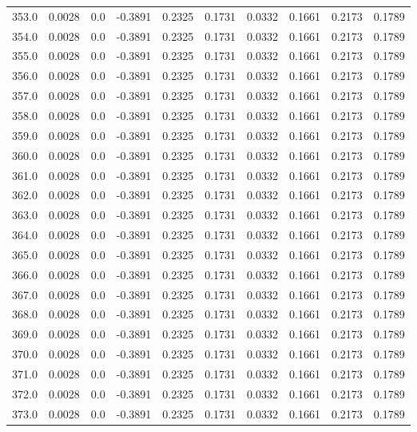 \begin{longtable}{lrrrrrrrrr}
353.0 & 0.0028 & 0.0 & -0.3891 & 0.2325 & 0.1731 & 0.0332 & 0.1661 & 0.2173 & 0.1789 \\
354.0 & 0.0028 & 0.0 & -0.3891 & 0.2325 & 0.1731 & 0.0332 & 0.1661 & 0.2173 & 0.1789 \\
355.0 & 0.0028 & 0.0 & -0.3891 & 0.2325 & 0.1731 & 0.0332 & 0.1661 & 0.2173 & 0.1789 \\
356.0 & 0.0028 & 0.0 & -0.3891 & 0.2325 & 0.1731 & 0.0332 & 0.1661 & 0.2173 & 0.1789 \\
357.0 & 0.0028 & 0.0 & -0.3891 & 0.2325 & 0.1731 & 0.0332 & 0.1661 & 0.2173 & 0.1789 \\
358.0 & 0.0028 & 0.0 & -0.3891 & 0.2325 & 0.1731 & 0.0332 & 0.1661 & 0.2173 & 0.1789 \\
359.0 & 0.0028 & 0.0 & -0.3891 & 0.2325 & 0.1731 & 0.0332 & 0.1661 & 0.2173 & 0.1789 \\
360.0 & 0.0028 & 0.0 & -0.3891 & 0.2325 & 0.1731 & 0.0332 & 0.1661 & 0.2173 & 0.1789 \\
361.0 & 0.0028 & 0.0 & -0.3891 & 0.2325 & 0.1731 & 0.0332 & 0.1661 & 0.2173 & 0.1789 \\
362.0 & 0.0028 & 0.0 & -0.3891 & 0.2325 & 0.1731 & 0.0332 & 0.1661 & 0.2173 & 0.1789 \\
363.0 & 0.0028 & 0.0 & -0.3891 & 0.2325 & 0.1731 & 0.0332 & 0.1661 & 0.2173 & 0.1789 \\
364.0 & 0.0028 & 0.0 & -0.3891 & 0.2325 & 0.1731 & 0.0332 & 0.1661 & 0.2173 & 0.1789 \\
365.0 & 0.0028 & 0.0 & -0.3891 & 0.2325 & 0.1731 & 0.0332 & 0.1661 & 0.2173 & 0.1789 \\
366.0 & 0.0028 & 0.0 & -0.3891 & 0.2325 & 0.1731 & 0.0332 & 0.1661 & 0.2173 & 0.1789 \\
367.0 & 0.0028 & 0.0 & -0.3891 & 0.2325 & 0.1731 & 0.0332 & 0.1661 & 0.2173 & 0.1789 \\
368.0 & 0.0028 & 0.0 & -0.3891 & 0.2325 & 0.1731 & 0.0332 & 0.1661 & 0.2173 & 0.1789 \\
369.0 & 0.0028 & 0.0 & -0.3891 & 0.2325 & 0.1731 & 0.0332 & 0.1661 & 0.2173 & 0.1789 \\
370.0 & 0.0028 & 0.0 & -0.3891 & 0.2325 & 0.1731 & 0.0332 & 0.1661 & 0.2173 & 0.1789 \\
371.0 & 0.0028 & 0.0 & -0.3891 & 0.2325 & 0.1731 & 0.0332 & 0.1661 & 0.2173 & 0.1789 \\
372.0 & 0.0028 & 0.0 & -0.3891 & 0.2325 & 0.1731 & 0.0332 & 0.1661 & 0.2173 & 0.1789 \\
373.0 & 0.0028 & 0.0 & -0.3891 & 0.2325 & 0.1731 & 0.0332 & 0.1661 & 0.2173 & 0.1789 \\

\end{longtable}
